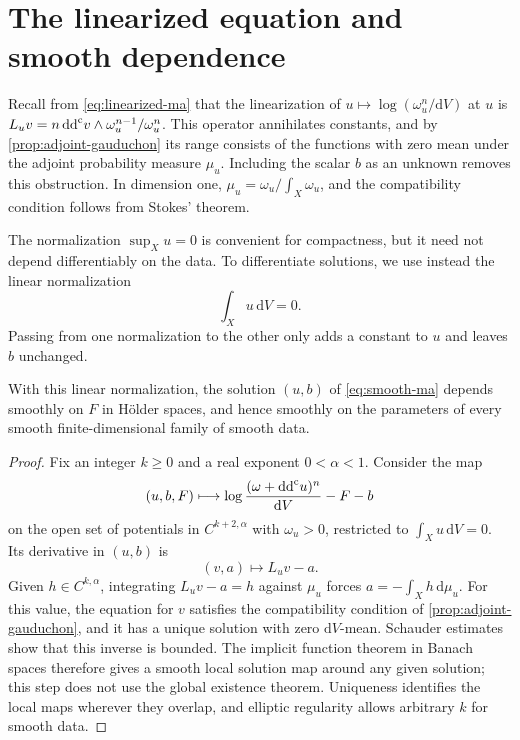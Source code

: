 \section{The linearized equation and smooth dependence}

Recall from \eqref{eq:linearized-ma} that the linearization of $u\mapsto\log(\omega_u^n/\mathrm{d}V)$ at $u$ is $L_uv=n\,\mathrm{dd}^{\mathrm{c}} v\wedge\omega_u^{n-1}/\omega_u^n$. This operator annihilates constants, and by \cref{prop:adjoint-gauduchon} its range consists of the functions with zero mean under the adjoint probability measure $\mu_u$. Including the scalar $b$ as an unknown removes this obstruction. In dimension one, $\mu_u=\omega_u/\int_X\omega_u$, and the compatibility condition follows from Stokes' theorem.

The normalization $\sup_Xu=0$ is convenient for compactness, but it need not depend differentiably on the data. To differentiate solutions, we use instead the linear normalization
\[
 \int_Xu\,\mathrm{d}V=0.
\]
Passing from one normalization to the other only adds a constant to $u$ and leaves $b$ unchanged.

\begin{proposition}\label{prop:smooth-dependence}
With this linear normalization, the solution $(u,b)$ of \eqref{eq:smooth-ma} depends smoothly on $F$ in H\"older spaces, and hence smoothly on the parameters of every smooth finite-dimensional family of smooth data.
\end{proposition}
\begin{proof}
Fix an integer $k\geq0$ and a real exponent $0<\alpha<1$. Consider the map
\[
 (u,b,F)\longmapsto
 \log\frac{(\omega+\mathrm{dd}^{\mathrm{c}} u)^n}{\mathrm{d}V}-F-b
\]
on the open set of potentials in $C^{k+2,\alpha}$ with $\omega_u>0$, restricted to $\int_Xu\,\mathrm{d}V=0$. Its derivative in $(u,b)$ is
\[
 (v,a)\longmapsto L_uv-a.
\]
Given $h\in C^{k,\alpha}$, integrating $L_uv-a=h$ against $\mu_u$ forces
$a=-\int_Xh\,\mathrm{d}\mu_u$. For this value, the equation for $v$ satisfies the compatibility condition of \cref{prop:adjoint-gauduchon}, and it has a unique solution with zero $\mathrm{d}V$-mean. Schauder estimates show that this inverse is bounded. The implicit function theorem in Banach spaces therefore gives a smooth local solution map around any given solution; this step does not use the global existence theorem. Uniqueness identifies the local maps wherever they overlap, and elliptic regularity allows arbitrary $k$ for smooth data.
\end{proof}

